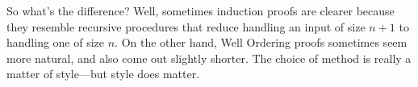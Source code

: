 \iffalse

\begin{notesproblem}
  Use Strong Induction to prove the Well Ordering Principle.
  \hint Prove that if a set of nonnegative integers contains an integer,
  $n$, then it has a smallest element.
\end{notesproblem}
\fi

So what's the difference?  Well, sometimes induction proofs are clearer
because they resemble recursive procedures that reduce handling an input
of size $n+1$ to handling one of size $n$.  On the other hand, Well
Ordering proofs sometimes seem more natural, and also come out slightly
shorter.  The choice of method is really a matter of style---but style
does matter.



\endinput
